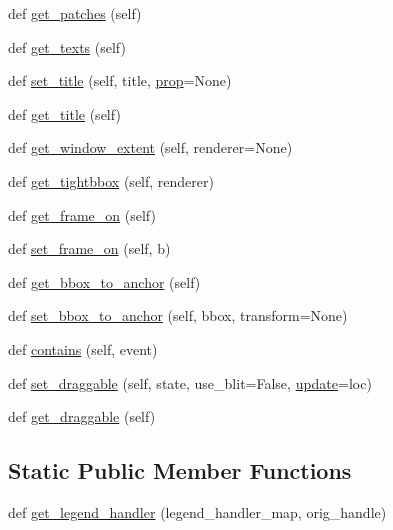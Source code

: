\begin{DoxyCompactItemize}
\item 
def \hyperlink{classmatplotlib_1_1legend_1_1Legend_ae1512f658876dfc0a90e97641c88a09b}{get\+\_\+patches} (self)
\item 
def \hyperlink{classmatplotlib_1_1legend_1_1Legend_a1d1b37102f56cea3509e563035964460}{get\+\_\+texts} (self)
\item 
def \hyperlink{classmatplotlib_1_1legend_1_1Legend_ab04806a97eb621a958331588b851454a}{set\+\_\+title} (self, title, \hyperlink{classmatplotlib_1_1legend_1_1Legend_ad10de5167a28d5cccf4cdd2f965d0d19}{prop}=None)
\item 
def \hyperlink{classmatplotlib_1_1legend_1_1Legend_ab18a4ba69c6dae3f77e845217babcb40}{get\+\_\+title} (self)
\item 
def \hyperlink{classmatplotlib_1_1legend_1_1Legend_a024e2c673df888d607b252ed58ca4eb8}{get\+\_\+window\+\_\+extent} (self, renderer=None)
\item 
def \hyperlink{classmatplotlib_1_1legend_1_1Legend_a21c5216eb7c3a1e21491adeb98b70ebf}{get\+\_\+tightbbox} (self, renderer)
\item 
def \hyperlink{classmatplotlib_1_1legend_1_1Legend_ab0296ac95c438dcf0edbd329d5d3e201}{get\+\_\+frame\+\_\+on} (self)
\item 
def \hyperlink{classmatplotlib_1_1legend_1_1Legend_a5cec6b9dea722d9167b810f347ee0242}{set\+\_\+frame\+\_\+on} (self, b)
\item 
def \hyperlink{classmatplotlib_1_1legend_1_1Legend_aeb6a77e48ae05f9682f940e1db52606f}{get\+\_\+bbox\+\_\+to\+\_\+anchor} (self)
\item 
def \hyperlink{classmatplotlib_1_1legend_1_1Legend_af439f85df59517a87470d7adce0b1b6d}{set\+\_\+bbox\+\_\+to\+\_\+anchor} (self, bbox, transform=None)
\item 
def \hyperlink{classmatplotlib_1_1legend_1_1Legend_a35fad0b6855abfd835e02af5cddf25a7}{contains} (self, event)
\item 
def \hyperlink{classmatplotlib_1_1legend_1_1Legend_af2fbe7faeea45224cebb6bc40198bcf5}{set\+\_\+draggable} (self, state, use\+\_\+blit=False, \hyperlink{classmatplotlib_1_1artist_1_1Artist_a9c412b279349ff90f4dc1559460907e2}{update}=\textquotesingle{}loc\textquotesingle{})
\item 
def \hyperlink{classmatplotlib_1_1legend_1_1Legend_a2186965e28b02003c8ac0f75268c1a84}{get\+\_\+draggable} (self)
\end{DoxyCompactItemize}
\subsection*{Static Public Member Functions}
\begin{DoxyCompactItemize}
\item 
def \hyperlink{classmatplotlib_1_1legend_1_1Legend_afbfe0980d2c7ced47f81cad221ef2774}{get\+\_\+legend\+\_\+handler} (legend\+\_\+handler\+\_\+map, orig\+\_\+handle)
\end{DoxyCompactItemize}
